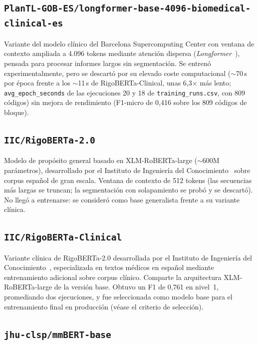 \subsection{\texttt{PlanTL-GOB-ES/longformer-base-4096-biomedical-clinical-es}}

Variante del modelo clínico del Barcelona Supercomputing Center con ventana de contexto ampliada a 4.096 tokens mediante atención dispersa (\emph{Longformer}~\cite{beltagy2020longformer}), pensada para procesar informes largos sin segmentación. Se entrenó experimentalmente, pero se descartó por su elevado coste computacional ($\sim$70\,s por época frente a los $\sim$11\,s de RigoBERTa-Clinical, unas 6,3$\times$ más lento; \texttt{avg\_epoch\_seconds} de las ejecuciones 20 y 18 de \texttt{training\_runs.csv}, con 809 códigos) sin mejora de rendimiento (F1-micro de 0{,}416 sobre los 809 códigos de bloque).

\subsection{\texttt{IIC/RigoBERTa-2.0}}

Modelo de propósito general basado en XLM-RoBERTa-large ($\sim$600M parámetros), desarrollado por el Instituto de Ingeniería del Conocimiento~\cite{vacaserrano2022rigoberta} sobre corpus español de gran escala. Ventana de contexto de 512 tokens (las secuencias más largas se truncan; la segmentación con solapamiento se probó y se descartó). No llegó a entrenarse: se consideró como base generalista frente a su variante clínica.

\subsection{\texttt{IIC/RigoBERTa-Clinical}}

Variante clínica de RigoBERTa-2.0 desarrollada por el Instituto de Ingeniería del Conocimiento~\cite{garciasubies2026rigobertaclinical}, especializada en textos médicos en español mediante entrenamiento adicional sobre corpus clínico. Comparte la arquitectura XLM-RoBERTa-large de la versión base. Obtuvo un F1 de 0{,}761 en nivel~1, promediando dos ejecuciones, y fue seleccionada como modelo base para el entrenamiento final en producción (véase el criterio de selección).

\subsection{\texttt{jhu-clsp/mmBERT-base}}

